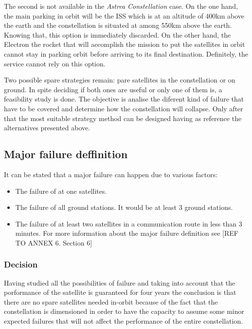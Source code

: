 The second is not available in the \textit{Astrea Constellation} case. On the one hand, the main parking in orbit will be the ISS which is at an altitude of 400km above the earth and the constellation is situated at among 550km above the earth. Knowing that, this option is immediately discarded. On the other hand, the Electron the rocket that will accomplish the mission to put the satellites in orbit cannot stay in parking orbit before arriving to its final destination. Definitely, the service cannot rely on this option.

Two possible spare strategies remain: pare satellites in the constellation or on ground. In spite deciding if both ones are useful or only one of them is, a feasibility study is done. The objective is analise the diferent kind of failure that have to be covered and determine how the constellation will collapse. Only after that the most suitable strategy method can be designed having as reference the alternatives presented above. 

\subsection{Major failure deffinition}
It can be stated that a major failure can happen due to various factors:
\begin{itemize}
\item The failure of at one satellites.
\item The failure of all ground stations. It would be at least 3 ground stations.
\item The failure of at least two satellites in a communication route in less than 3 minutes.
\newline\newline
For more information about the major failure definition see [{REF TO ANNEX 6. Section 6}]
\end{itemize}

\subsubsection{Decision}
Having studied all the possibilities of failure and taking into account that the porformance of the satellite is guaranteed for four years the conclusion is that there are no spare satellites needed in-orbit because of the fact that the constellation is dimensioned in order to have the capacity to assume some minor expected failures that will not affect the performance of the entire constellation.

